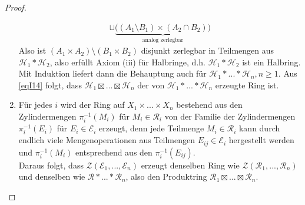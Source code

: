 \begin{proposition}
\begin{proof}
\begin{enumerate}[(\roman*),topsep=5pt]
\begin{equation*}
\begin{split}
		\sqcup \underbrace{\big( (A_1 \setminus B_1) \times (A_2 \cap B_2)\big)}_{\text{analog zerlegbar}}
	\end{split}
	\end{equation*}
	Also ist $(A_1 \times A_2) \setminus (B_1 \times B_2) $ disjunkt zerlegbar in Teilmengen aus $\mathcal{H}_1 \ast \mathcal{H}_2$, also erfüllt Axiom (iii) für Halbringe, d.h.  $\mathcal{H}_1 \ast \mathcal{H}_2$ ist ein Halbring. \\
	Mit Induktion liefert dann die Behauptung auch für $\mathcal{H}_1 \ast ... \ast \mathcal{H}_n, n\geq 1$. \newline
	Aus \eqref{eqI14} folgt, dass $\mathcal{H}_1 \boxtimes ... \boxtimes \mathcal{H}_n$ der von $\mathcal{H}_1 \ast ... \ast \mathcal{H}_n$ erzeugte Ring ist.
	\item Für jedes $i$ wird der Ring auf $X_1 \times ... \times X_n$ bestehend aus den Zylindermengen $\pi_i^{-1}(M_i)$ für $M_i \in \mathcal{R}_i$ von der Familie der Zylindermengen $\pi_i^{-1}(E_i)$ für $E_i \in \mathcal{E}_i$ erzeugt, denn jede Teilmenge $M_i \in \mathcal{R}_i$ kann durch endlich viele Mengenoperationen aus Teilmengen $E_{ij} \in \mathcal{E}_i$ hergestellt werden und $\pi^{-1}_i(M_i)$ entsprechend aus den $\pi_i^{-1}(E_{ij})$. \\
	Daraus folgt, dass $\mathcal{Z}(\mathcal{E}_1,...,\mathcal{E}_n)$ erzeugt denselben Ring wie $\mathcal{Z}( \mathcal{R}_1,...,\mathcal{R}_n)$ und denselben wie $\mathcal{R} \ast ... \ast \mathcal{R}_n$, also den Produktring $\mathcal{R}_1 \boxtimes ... \boxtimes \mathcal{R}_n$.
\end{enumerate}
\end{proof}
\end{proposition}
